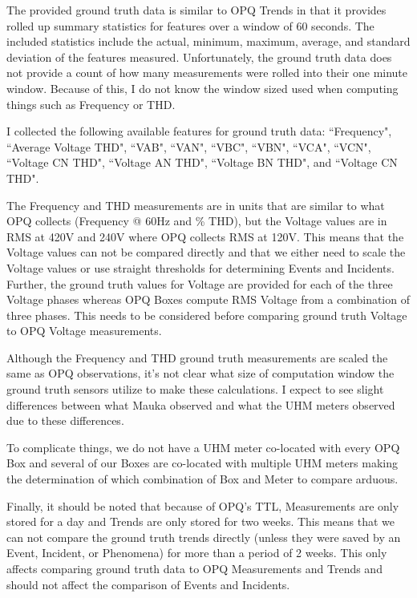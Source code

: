 The provided ground truth data is similar to OPQ Trends in that it provides rolled up summary statistics for features over a window of 60 seconds. The included statistics include the actual, minimum, maximum, average, and standard deviation of the features measured. Unfortunately, the ground truth data does not provide a count of how many measurements were rolled into their one minute window. Because of this, I do not know the window sized used when computing things such as Frequency or THD.

I collected the following available features for ground truth data: ``Frequency", ``Average Voltage THD", ``VAB", ``VAN", ``VBC", ``VBN", ``VCA", ``VCN", ``Voltage CN THD", ``Voltage AN THD", ``Voltage BN THD", and ``Voltage CN THD".

The Frequency and THD measurements are in units that are similar to what OPQ collects (Frequency @ 60Hz and \% THD), but the Voltage values are in RMS at 420V and 240V where OPQ collects RMS at 120V. This means that the Voltage values can not be compared directly and that we either need to scale the Voltage values or use straight thresholds for determining Events and Incidents. Further, the ground truth values for Voltage are provided for each of the three Voltage phases whereas OPQ Boxes compute RMS Voltage from a combination of three phases. This needs to be considered before comparing ground truth Voltage to OPQ Voltage measurements.

Although the Frequency and THD ground truth measurements are scaled the same as OPQ observations, it's not clear what size of computation window the ground truth sensors utilize to make these calculations. I expect to see slight differences between what Mauka observed and what the UHM meters observed due to these differences.

To complicate things, we do not have a UHM meter co-located with every OPQ Box and several of our Boxes are co-located with multiple UHM meters making the determination of which combination of Box and Meter to compare arduous.

Finally, it should be noted that because of OPQ's TTL, Measurements are only stored for a day and Trends are only stored for two weeks. This means that we can not compare the ground truth trends directly (unless they were saved by an Event, Incident, or Phenomena) for more than a period of 2 weeks. This only affects comparing ground truth data to OPQ Measurements and Trends and should not affect the comparison of Events and Incidents.

